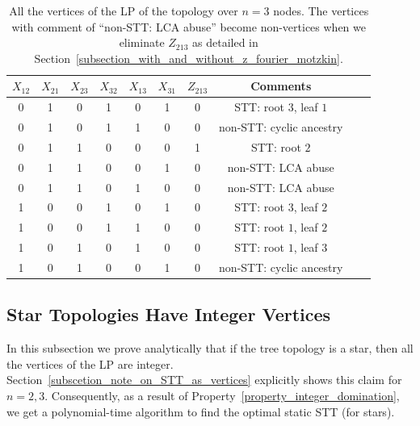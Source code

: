\begin{table}[!ht]%
    \scriptsize
    \begin{center}
    \begin{tabular}{|c|c|c|c|c|c|c|c|c|l|}
    \hline
    $X_{12}$ & $X_{21}$ & $X_{23}$ & $X_{32}$ & $X_{13}$ & $X_{31}$ & $Z_{213}$ & Comments \\
    \hline
    \hline
    0 & 1 & 0 & 1 & 0 & 1 & 0 & STT: root $3$, leaf $1$ \\
    \hline
    0 & 1 & 0 & 1 & 1 & 0 & 0 & non-STT: cyclic ancestry  \\
    \hline
    0 & 1 & 1 & 0 & 0 & 0 & 1 & STT: root $2$ \\
    \hline
    0 & 1 & 1 & 0 & 0 & 1 & 0 & non-STT: LCA abuse  \\
    \hline
    0 & 1 & 1 & 0 & 1 & 0 & 0 & non-STT: LCA abuse  \\
    \hline
    1 & 0 & 0 & 1 & 0 & 1 & 0 & STT: root $3$, leaf $2$ \\
    \hline
    1 & 0 & 0 & 1 & 1 & 0 & 0 & STT: root $1$, leaf $2$  \\
    \hline
    1 & 0 & 1 & 0 & 1 & 0 & 0 & STT: root $1$, leaf $3$  \\
    \hline
    1 & 0 & 1 & 0 & 0 & 1 & 0 & non-STT: cyclic ancestry \\
    \hline
    \hline
    \end{tabular}
    \end{center}
    \caption{\footnotesize{All the vertices of the LP of the topology over $n=3$ nodes. The vertices with comment of ``non-STT: LCA abuse'' become non-vertices when we eliminate $Z_{213}$ as detailed in Section~\ref{subsection_with_and_without_z_fourier_motzkin}.}}
    \label{table_vertices_n3}
\end{table}



\subsection{Star Topologies Have Integer Vertices}
\label{subsection_star_is_integer}

In this subsection we prove analytically that if the tree topology is a star, then all the vertices of the LP are integer. Section~\ref{subscetion_note_on_STT_as_vertices} explicitly shows this claim for $n=2,3$. Consequently, as a result of Property~\ref{property_integer_domination}, we get a polynomial-time algorithm to find the optimal static STT (for stars). 


